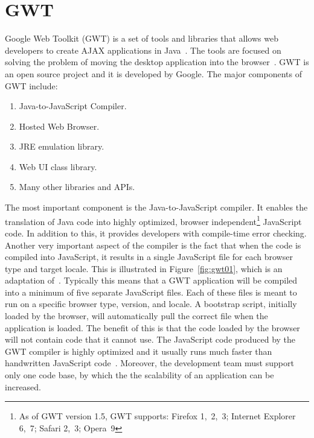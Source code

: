 \section{GWT} 
\label{sec:gwt}
Google Web Toolkit (GWT) is a set of tools and libraries that allows
web developers to create AJAX applications in Java~\cite{wgwt}. 
The tools are focused on solving the problem of moving the desktop application into the
browser~\cite{bgwt2}. GWT is an open source project and it is developed 
by Google. The major components of GWT include: 

\begin{enumerate}
	\item Java-to-JavaScript Compiler.
	\item Hosted Web Browser.
	\item JRE emulation library.
	\item Web UI class library.
	\item Many other libraries and APIs.
\end{enumerate}

The most important component is the Java-to-JavaScript compiler. It enables the 
translation of Java code into highly optimized, browser 
independent\footnote{As of GWT version 1.5, GWT supports: 
Firefox 1,~2,~3; Internet Explorer 6,~7; Safari 2,~3; Opera~9}
JavaScript code. 
In addition to this, it provides developers with compile-time error checking. 
Another very important
aspect of the compiler is the fact that when the code is compiled into JavaScript,
it results in 
a single JavaScript file for each browser type and target locale. This is illustrated 
in Figure~\ref{fig:gwt01}, which is an adaptation of~\cite[Figure 7]{wgio2}. 
Typically this means that a GWT application will be compiled into 
a minimum of five separate JavaScript files. Each of these files is meant to run 
on a specific browser type, version, and locale. A bootstrap script, initially 
loaded by the browser, will 
automatically pull the correct file when the
application is loaded. The benefit of this is that the code loaded by the browser 
will not contain code that it cannot use. The JavaScript code produced by the GWT 
compiler is highly optimized and it usually runs much faster than handwritten 
JavaScript code~\cite{wgio1}. Moreover, the development team must support only
one code base, by which the the scalability of an application can be increased.  

